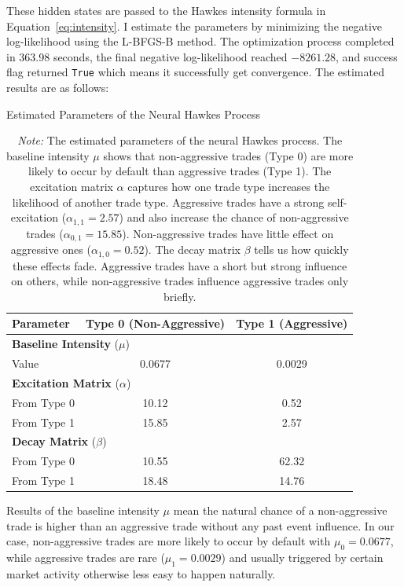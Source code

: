These hidden states are passed to the Hawkes intensity formula in Equation~\ref{eq:intensity}. I estimate the parameters by minimizing the negative log-likelihood using the L-BFGS-B method. The optimization process completed in 363.98 seconds, the final negative log-likelihood reached $-8261.28$, and success flag returned \texttt{True} which means it successfully get convergence. The estimated results are as follows:
\begin{table}[H]
    \centering
    \caption{Estimated Parameters of the Neural Hawkes Process}
    \caption*{\textit{Note:} The estimated parameters of the neural Hawkes process. The baseline intensity $\mu$ shows that non-aggressive trades (Type 0) are more likely to occur by default than aggressive trades (Type 1). The excitation matrix $\alpha$ captures how one trade type increases the likelihood of another trade type. Aggressive trades have a strong self-excitation ($\alpha_{1,1} = 2.57$) and also increase the chance of non-aggressive trades ($\alpha_{0,1} = 15.85$). Non-aggressive trades have little effect on aggressive ones ($\alpha_{1,0} = 0.52$). The decay matrix $\beta$ tells us how quickly these effects fade. Aggressive trades have a short but strong influence on others, while non-aggressive trades influence aggressive trades only briefly.}
    \label{tb:hawkes-params}
    \begin{tabular}{lcc}
    \toprule
    \textbf{Parameter} & \textbf{Type 0 (Non-Aggressive)} & \textbf{Type 1 (Aggressive)} \\
    \midrule
    \multicolumn{3}{l}{\textbf{Baseline Intensity} (\( \mu \))} \\
    \quad Value & 0.0677 & 0.0029 \\
    \midrule
    \multicolumn{3}{l}{\textbf{Excitation Matrix} (\( \alpha \))} \\
    \quad From Type 0 & 10.12 & 0.52 \\
    \quad From Type 1 & 15.85 & 2.57 \\
    \midrule
    \multicolumn{3}{l}{\textbf{Decay Matrix} (\( \beta \))} \\
    \quad From Type 0 & 10.55 & 62.32 \\
    \quad From Type 1 & 18.48 & 14.76 \\
    \bottomrule
    \end{tabular}
\end{table}

Results of the baseline intensity $\mu$ mean the natural chance of a non-aggressive trade is higher than an aggressive trade without any past event influence. In our case, non-aggressive trades are more likely to occur by default with $\mu_0 = 0.0677$, while aggressive trades are rare ($\mu_1 = 0.0029$) and usually triggered by certain market activity otherwise less easy to happen naturally.

